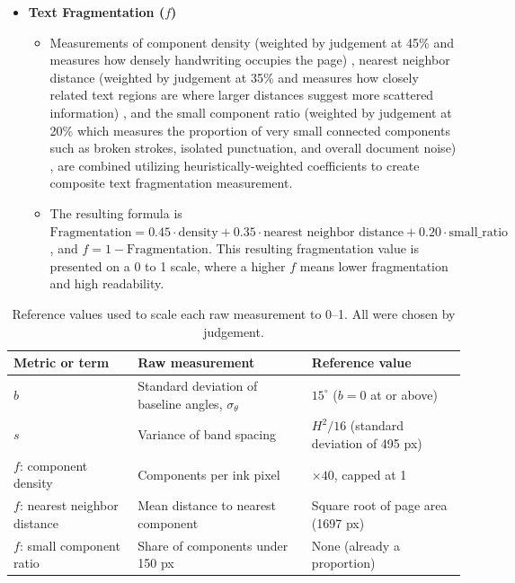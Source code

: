 \documentclass[conference]{IEEEtran}
\begin{document}
\begin{itemize}
  \item \textbf{Text Fragmentation ($f$)}
  \begin{itemize}
    \item Measurements of component density (weighted by judgement at 45\% and
    measures how densely handwriting occupies the page) \cite{fujisawa1992},
    nearest neighbor distance (weighted by judgement at 35\% and measures how
    closely related text regions are where larger distances suggest more
    scattered information) \cite{ogorman1993, clark1954}, and the small
    component ratio (weighted by judgement at 20\% which measures the
    proportion of very small connected components such as broken strokes,
    isolated punctuation, and overall document noise)
    \cite{fujisawa1992, ye2013}, are combined utilizing heuristically-weighted
    coefficients to create composite text fragmentation measurement.
    \item The resulting formula is
    $\text{Fragmentation} = 0.45 \cdot \text{density} + 0.35 \cdot
    \text{nearest neighbor distance} + 0.20 \cdot \text{small\_ratio}$,
    and $f = 1 - \text{Fragmentation}$. This resulting fragmentation value is
    presented on a 0 to 1 scale, where a higher $f$ means lower fragmentation
    and high readability.
  \end{itemize}
\end{itemize}

\begin{table}[!t]
  \centering
  \caption{Reference values used to scale each raw measurement to 0--1. All
  were chosen by judgement.}
  \label{tab:reference}
  \footnotesize
  \setlength{\tabcolsep}{3pt}
  \renewcommand{\arraystretch}{1.15}
  \begin{tabular}{@{}>{\raggedright\arraybackslash}p{2.1cm}>{\raggedright\arraybackslash}p{2.9cm}>{\raggedright\arraybackslash}p{3.3cm}@{}}
    \toprule
    Metric or term & Raw measurement & Reference value \\
    \midrule
    $b$ & Standard deviation of baseline angles, $\sigma_\theta$ & $15^\circ$ ($b = 0$ at or above) \\
    $s$ & Variance of band spacing & $H^2/16$ (standard deviation of 495 px) \\
    $f$: component density & Components per ink pixel & $\times 40$, capped at 1 \\
    $f$: nearest neighbor distance & Mean distance to nearest component & Square root of page area (1697 px) \\
    $f$: small component ratio & Share of components under 150 px & None (already a proportion) \\
    \bottomrule
  \end{tabular}
\end{table}
\end{document}
